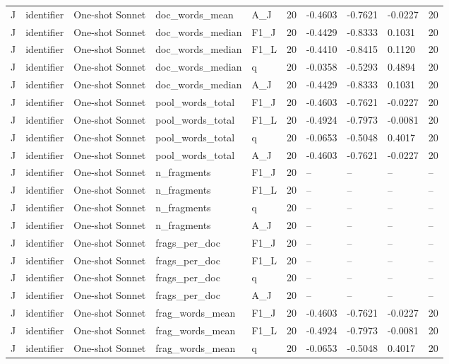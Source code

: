 \begin{table}[t]
{\begin{tabular}{llllllllll}
J & identifier & One-shot Sonnet & doc\_words\_mean & A\_J & 20 & -0.4603 & -0.7621 & -0.0227 & 20 \\
J & identifier & One-shot Sonnet & doc\_words\_median & F1\_J & 20 & -0.4429 & -0.8333 & 0.1031 & 20 \\
J & identifier & One-shot Sonnet & doc\_words\_median & F1\_L & 20 & -0.4410 & -0.8415 & 0.1120 & 20 \\
J & identifier & One-shot Sonnet & doc\_words\_median & q & 20 & -0.0358 & -0.5293 & 0.4894 & 20 \\
J & identifier & One-shot Sonnet & doc\_words\_median & A\_J & 20 & -0.4429 & -0.8333 & 0.1031 & 20 \\
J & identifier & One-shot Sonnet & pool\_words\_total & F1\_J & 20 & -0.4603 & -0.7621 & -0.0227 & 20 \\
J & identifier & One-shot Sonnet & pool\_words\_total & F1\_L & 20 & -0.4924 & -0.7973 & -0.0081 & 20 \\
J & identifier & One-shot Sonnet & pool\_words\_total & q & 20 & -0.0653 & -0.5048 & 0.4017 & 20 \\
J & identifier & One-shot Sonnet & pool\_words\_total & A\_J & 20 & -0.4603 & -0.7621 & -0.0227 & 20 \\
J & identifier & One-shot Sonnet & n\_fragments & F1\_J & 20 & -- & -- & -- & -- \\
J & identifier & One-shot Sonnet & n\_fragments & F1\_L & 20 & -- & -- & -- & -- \\
J & identifier & One-shot Sonnet & n\_fragments & q & 20 & -- & -- & -- & -- \\
J & identifier & One-shot Sonnet & n\_fragments & A\_J & 20 & -- & -- & -- & -- \\
J & identifier & One-shot Sonnet & frags\_per\_doc & F1\_J & 20 & -- & -- & -- & -- \\
J & identifier & One-shot Sonnet & frags\_per\_doc & F1\_L & 20 & -- & -- & -- & -- \\
J & identifier & One-shot Sonnet & frags\_per\_doc & q & 20 & -- & -- & -- & -- \\
J & identifier & One-shot Sonnet & frags\_per\_doc & A\_J & 20 & -- & -- & -- & -- \\
J & identifier & One-shot Sonnet & frag\_words\_mean & F1\_J & 20 & -0.4603 & -0.7621 & -0.0227 & 20 \\
J & identifier & One-shot Sonnet & frag\_words\_mean & F1\_L & 20 & -0.4924 & -0.7973 & -0.0081 & 20 \\
J & identifier & One-shot Sonnet & frag\_words\_mean & q & 20 & -0.0653 & -0.5048 & 0.4017 & 20 \\

\end{tabular}}
\end{table}
